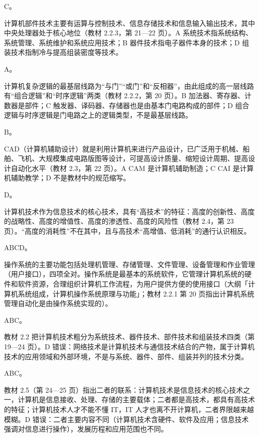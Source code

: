 \documentclass[a4paper,11pt]{article}
\begin{document}
\q C。\begin{analysis}计算机部件技术主要有运算与控制技术、信息存储技术和信息输入输出技术，其中中央处理器处于核心地位（教材 2.2.3，第 21—22 页）。A 系统技术指系统结构、系统管理、系统维护和系统应用技术；B 器件技术指电子器件本身的技术；D 组装技术指制冷与提高组装密度等技术。\end{analysis}

\q A。\begin{analysis}计算机复杂逻辑的最基层线路为“与门”“或门”和“反相器”，由此组成的高一层线路有“组合逻辑”和“时序逻辑”两类（教材 2.2.2，第 20 页）。B 加法器、寄存器、计数器是部件；C 触发器、译码器、存储器也是由基本门电路构成的部件；D 组合逻辑与时序逻辑是门电路之上的逻辑类型，不是最基层线路。\end{analysis}

\q B。\begin{analysis}CAD（计算机辅助设计）就是利用计算机来进行产品设计，已广泛用于机械、船舶、飞机、大规模集成电路版图等设计，可提高设计质量、缩短设计周期、提高设计自动化水平（教材 2.3，第 22 页）。A CAM 是计算机辅助制造；C CAI 是计算机辅助教学；D 不是教材中的规范缩写。\end{analysis}

\q D。\begin{analysis}计算机技术作为信息技术的核心技术，具有“高技术”的特征：高度的创新性、高度的战略性、高度的增值性、高度的渗透性、高度的风险性（教材 2.4，第 23 页）。“高度的消耗性”不在其中，且与高技术“高增值、低消耗”的通行认识相反。\end{analysis}


\q ABCD。\begin{analysis}操作系统的主要功能包括处理机管理、存储管理、文件管理、设备管理和作业管理（用户接口），四项全对。操作系统是最基本的系统软件，它管理计算机系统的硬件和软件资源，合理组织计算机工作流程，为用户提供方便的使用接口（大纲「计算机系统组成，计算机操作系统原理与功能」；教材 2.2.1 第 20 页指出计算机系统管理自动化是由操作系统实现的）。\end{analysis}

\q ABC。\begin{analysis}教材 2.2 把计算机技术粗分为系统技术、器件技术、部件技术和组装技术四类（第 19—24 页）。D 错误：网络技术是计算机技术与通信技术结合的产物，属于计算机技术的应用领域和外部环境，不是与系统、器件、部件、组装并列的技术分类。\end{analysis}

\q ABC。\begin{analysis}教材 2.5（第 24—25 页）指出二者的联系：计算机技术是信息技术的核心技术之一，计算机是信息接收、处理、存储的主要载体；二者都是高技术，都具有高技术的特征；计算机技术人才不能不懂 IT，IT 人才也离不开计算机，二者界限越来越模糊。D 错误：二者主要内容不同（计算机技术含硬件、软件及应用；信息技术强调对信息进行操作），发展历程和应用范围也不同。\end{analysis}
\end{document}
